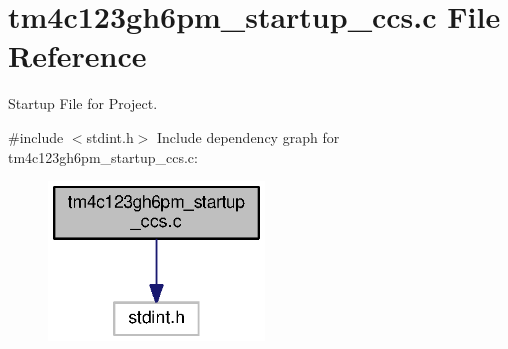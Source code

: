 \section{tm4c123gh6pm\+\_\+startup\+\_\+ccs.\+c File Reference}
\label{tm4c123gh6pm__startup__ccs_8c}


Startup File for Project.  


{\ttfamily \#include $<$stdint.\+h$>$}\newline
Include dependency graph for tm4c123gh6pm\+\_\+startup\+\_\+ccs.\+c\+:
\nopagebreak
\begin{figure}[H]
\begin{center}
\leavevmode
\includegraphics[width=163pt]{tm4c123gh6pm__startup__ccs_8c__incl}
\end{center}
\end{figure}
